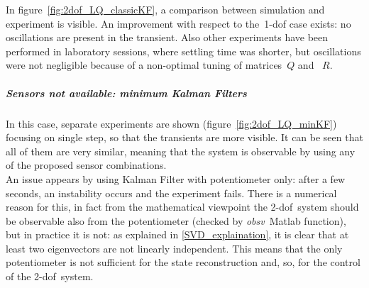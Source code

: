 In figure~\ref{fig:2dof_LQ_classicKF}, a comparison between simulation and experiment is visible. An improvement with respect to the~\acrshort{1-dof} case exists: no oscillations are present in the transient. Also other experiments have been performed in laboratory sessions, where settling time was shorter, but oscillations were not negligible because of a non-optimal tuning of matrices~$Q$ and ~$R$.

\subparagraph{Sensors not available: minimum Kalman Filters}

In this case, separate experiments are shown (figure~\ref{fig:2dof_LQ_minKF}) focusing on single step, so that the transients are more visible. It can be seen that all of them are very similar, meaning that the system is observable by using any of the proposed sensor combinations. \\
An issue appears by using Kalman Filter with potentiometer only: after a few seconds, an instability occurs and the experiment fails. There is a numerical reason for this, in fact from the mathematical viewpoint the \acrshort{2-dof}~system should be observable also from the potentiometer (checked by \textit{obsv}~Matlab function), but in practice it is not: as explained in \cref{SVD_explaination}, it is clear that at least two eigenvectors are not linearly independent.
This means that the only potentiometer is not sufficient for the state reconstruction and, so, for the control of the \acrshort{2-dof}~system.


